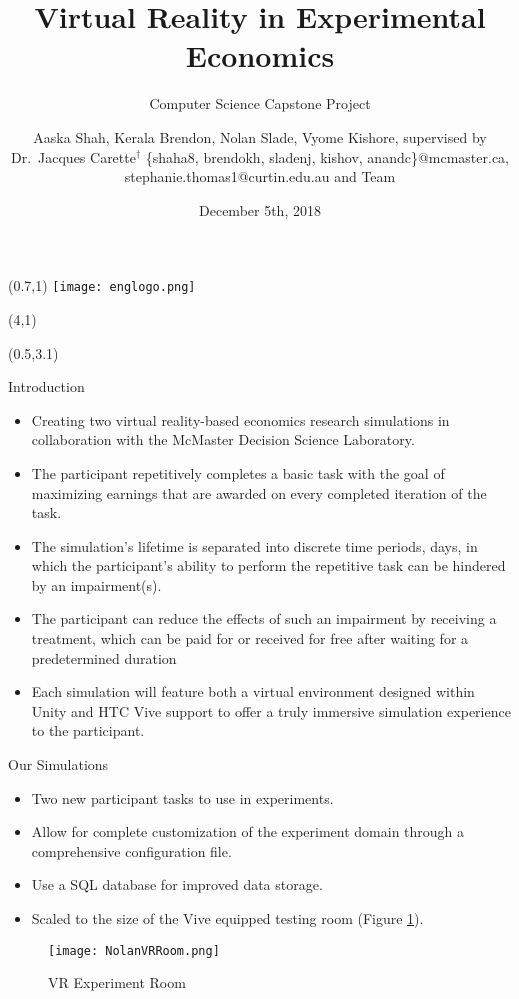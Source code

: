 \documentclass[22pt]{beamer}
\title{Virtual Reality in Experimental Economics}
\subtitle{Computer Science Capstone Project}
\author[Shah, Brendon, Slade, Kishore \& Carette]{Aaska Shah, Kerala Brendon, Nolan Slade, Vyome Kishore, supervised by Dr.~Jacques Carette$^\dagger$ \vspace{0.3cm} \newline \small \{shaha8, brendokh, sladenj, kishov, anandc\}@mcmaster.ca, stephanie.thomas1@curtin.edu.au and Team}
\institute[McMaster University]{$^\dagger$Department of Computing and Software, McMaster University

1280 Main St. W, Hamilton, Ontario, Canada L8S 4L8}
\date{December 5th, 2018}
\begin{document}

\begin{frame}[fragile]

\begin{textblock}{2}(0.7,1)
\texttt{[image: englogo.png]} %
\end{textblock}

\begin{textblock}{8}(4,1)
\titlepage
\end{textblock}

\begin{textblock}{7.25}(0.5,3.1)

\begin{block}{Introduction}
\begin{itemize}
\item Creating two virtual reality-based economics research simulations in collaboration with the McMaster Decision Science Laboratory.
\item The participant repetitively completes a basic task with the goal of maximizing
earnings that are awarded on every completed iteration of the task.
\item The simulation's lifetime is separated into discrete time periods, days, in which the participant's ability to perform the repetitive task can be hindered by an impairment(s).
\item The participant can reduce the
effects of such an impairment by receiving a treatment, which can be paid for or received for free after waiting for a predetermined duration
\item Each simulation will feature both a virtual environment designed within Unity
and HTC Vive support to offer a truly immersive simulation experience to the
participant.
\end{itemize}

\end{block}


\begin{block}{Our Simulations}
\begin{itemize}
\item Two new participant tasks to use in experiments.
\item Allow for complete customization of the experiment domain through a  comprehensive configuration file.
\item Use a SQL database for improved data storage.
\item Scaled to the size of the Vive equipped testing room (Figure \ref{fig:room}).
\end{itemize}
\begin{figure}
    \texttt{[image: NolanVRRoom.png]}
  \caption{VR Experiment Room}
\label{fig:room}
\end{figure}
\end{block}


\end{textblock}
\end{frame}
\end{document}
